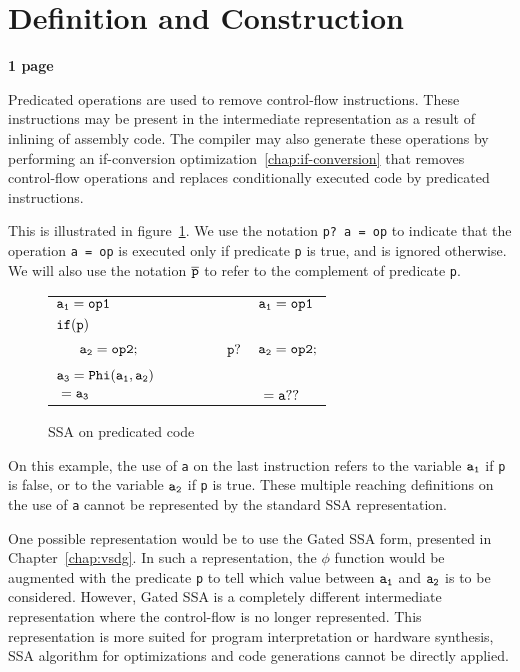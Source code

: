 \section{Definition and Construction}

\textbf{1 page}


Predicated operations are used to remove control-flow instructions.
These instructions may be present in the intermediate representation
as a result of inlining of assembly code. The compiler may also
generate these operations by performing an if-conversion
optimization~\ref{chap:if-conversion} that removes control-flow
operations and replaces conditionally executed code by predicated
instructions.

This is illustrated in figure~\ref{fig:op_pred0}. We use the notation
{\tt p? a = op} to indicate that the operation {\tt a = op} is
executed only if predicate {\tt p} is true, and is ignored
otherwise. We will also use the notation ${\tt \overline{p}}$ to refer
to the complement of predicate {\tt p}.

\begin{figure}
\begin{center}
\footnotesize
\begin{tabular}{llll}
${\tt a_1 = op1}$ & & & ${\tt a_1 = op1}$ \\
${\tt if (p)}$        & & & \\
${\tt\ \ \ \ \ a_2 = op2;}$ & \ \ \ \ \  & ${\tt p?}$ & ${\tt a_2 = op2;}$ \\
${\tt a_3 = Phi(a_1, a_2)}$ & & & \\
${\tt \ = a_3}$ & & & ${\tt \ = a??}$ \\
\end{tabular}
\caption{SSA on predicated code}
\label{fig:op_pred0}
\end{center}
\end{figure}

On this example, the use of {\tt a} on the last instruction refers to
the variable ${\tt a_1}$ if {\tt p} is false, or to the variable ${\tt
  a_2}$ if {\tt p} is true. These multiple reaching definitions on the
use of {\tt a} cannot be represented by the standard SSA
representation.

One possible representation would be to use the Gated SSA form,
presented in Chapter~\ref{chap:vsdg}. In such a representation, the
$\phi$ function would be augmented with the predicate {\tt p} to tell
which value between ${\tt a_1}$ and ${\tt a_2}$ is to be
considered. However, Gated SSA is a completely different intermediate
representation where the control-flow is no longer represented. This
representation is more suited for program interpretation or hardware
synthesis, SSA algorithm for optimizations and code generations cannot
be directly applied.


